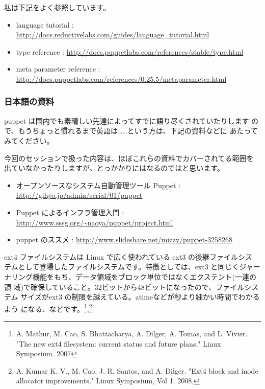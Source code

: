 \documentclass[mingoth,a4paper]{jsarticle}
\begin{document}
私は下記をよく参照しています。

\begin{itemize}
 \item language tutorial : \url{http://docs.reductivelabs.com/guides/language_tutorial.html}
 \item type reference : \url{http://docs.puppetlabs.com/references/stable/type.html}
 \item meta parameter reference : \url{http://docs.puppetlabs.com/references/0.25.5/metaparameter.html}
\end{itemize}

\subsubsection{日本語の資料}

puppet は国内でも素晴しい先達によってすでに語り尽くされていたりします
ので、もうちょっと慣れるまで英語は……という方は、下記の資料などに
あたってみてください。

今回のセッションで扱った内容は、ほぼこれらの資料でカバーされてる範囲を
出ていなかったりしますが、とっかかりにはなるのではと思います。

\begin{itemize}
 \item オープンソースなシステム自動管理ツール Puppet : \url{http://gihyo.jp/admin/serial/01/puppet}
 \item Puppet によるインフラ管理入門 : \url{http://www.sssg.org/~naoya/puppet/project.html}
 \item puppet のススメ : \url{http://www.slideshare.net/mizzy/puppet-3258268}
\end{itemize}



ext4 ファイルシステムは Linux で広く使われている ext3 の後継ファイルシス
テムとして登場したファイルシステムです。特徴としては、ext3 と同じくジャー
ナリング機能をもち、データ領域をブロック単位ではなくエクステント(一連の領
域)で確保していること。32ビットから48ビットになったので、ファイルシステム
サイズがext3 の制限を越えている。atimeなどが秒より細かい時間でわかるよう
になる、などです。\footnote{A. Mathur, M. Cao, S. Bhattacharya, A. Dilger, A. Tomas, and
 L. Vivier. "The new ext4 filesystem: current status and future plans,"
 Linux Symposium. 2007},\footnote{A. Kumar K. V., M. Cao, J. R. Santos, and A. Dilger. "Ext4 block and inode allocator improvements," Linux Symposium, Vol 1. 2008.}
\end{document}
